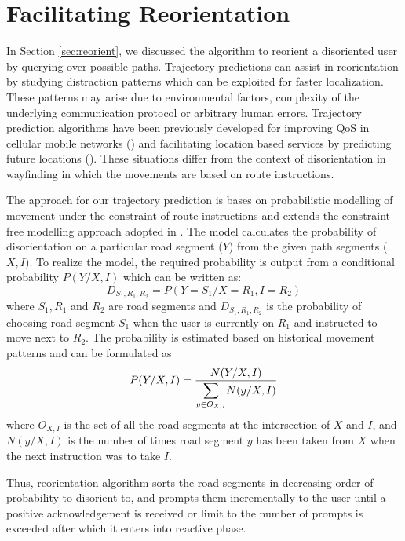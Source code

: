 \documentclass{iitkthesis}
\begin{document}
\section{Facilitating Reorientation}
In Section \ref{sec:reorient}, we discussed the algorithm to reorient a 
disoriented user by querying over possible paths. Trajectory predictions 
can assist in reorientation by studying distraction patterns which can be 
exploited for faster localization. These patterns may arise due to 
environmental factors, complexity of the underlying communication 
protocol or arbitrary human errors. Trajectory prediction algorithms have 
been previously developed for improving QoS in cellular mobile networks 
(\cite{kyri}) and facilitating location based services by predicting 
future locations (\cite{karimi}). These situations differ from the 
context of disorientation in wayfinding in which the movements are 
based on route instructions. 

The approach for our trajectory prediction is bases on probabilistic 
modelling of movement under the constraint of route-instructions and 
extends the constraint-free modelling approach adopted in \cite{liu}. The 
model calculates the probability of disorientation on a particular road segment 
($Y$) from the given path segments ($X,I$). To realize the model, the 
required probability is output from a conditional probability $P(Y/X,I)$ 
which can be written as:
%
$$D_{S_1,R_1,R_2} = P(Y=S_1/X=R_1,I=R_2)$$
%
where $S_1,R_1$ and $R_2$ are road segments and $D_{S_1,R_1,R_2}$ is the 
probability of choosing road segment $S_1$ when the user is currently 
on $R_1$ and instructed to move next to $R_2$. The probability is 
estimated based on historical movement patterns and can be formulated as
%
\[ \displaystyle P(Y/X,I) = \frac{N(Y/X,I)}{ \mathlarger{\sum}\limits_{y \in O_{X,I}} N(y/X,I)} \] 
%
where $O_{X,I}$ is the set of all the road segments at the intersection 
of $X$ and $I$, and $N(y/X,I)$ is the number of times road segment $y$ 
has been taken from $X$ when the next instruction was to take $I$. 

Thus, reorientation algorithm sorts the road segments in decreasing order 
of probability to disorient to, and prompts them incrementally to the 
user until a positive acknowledgement is received or limit to the number 
of prompts is exceeded after which it enters into reactive phase.

\iffalse
$$
\begin{bmatrix}
P(X_2=R_1/X_1=R_1,I=R_1) & P(X_2=R_1/X_1=R_1,I=R_1) & \cdots & P(X_2=R_1/X_1=R_1,I=R_1)\\
P(X_2=R_1/X_1=R_1,I=R_1) & P(X_2=R_1/X_1=R_1,I=R_1) & \cdots & P(X_2=R_1/X_1=R_1,I=R_1)\\
\vdots& \vdots& \cdots& \vdots\\ 
P(X_2=R_1/X_1=R_1,I=R_1) & P(X_2=R_1/X_1=R_1,I=R_1) & \cdots &P(X_2=R_1/X_1=R_1,I=R_1)\\
\end{bmatrix}
$$
\fi
\end{document}
